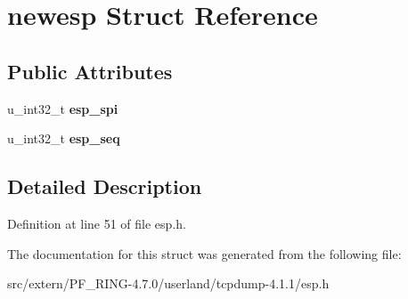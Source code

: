 \hypertarget{structnewesp}{
\section{newesp Struct Reference}
\label{structnewesp}
}
\subsection*{Public Attributes}
\begin{DoxyCompactItemize}
\item 
\hypertarget{structnewesp_a81fa5508b1a66e938525deaaea3d3705}{
u\_\-int32\_\-t {\bfseries esp\_\-spi}}
\label{structnewesp_a81fa5508b1a66e938525deaaea3d3705}

\item 
\hypertarget{structnewesp_adaae9cad8c859802c5dd7e31ad7363e1}{
u\_\-int32\_\-t {\bfseries esp\_\-seq}}
\label{structnewesp_adaae9cad8c859802c5dd7e31ad7363e1}

\end{DoxyCompactItemize}


\subsection{Detailed Description}


Definition at line 51 of file esp.h.



The documentation for this struct was generated from the following file:\begin{DoxyCompactItemize}
\item 
src/extern/PF\_\-RING-\/4.7.0/userland/tcpdump-\/4.1.1/esp.h\end{DoxyCompactItemize}
